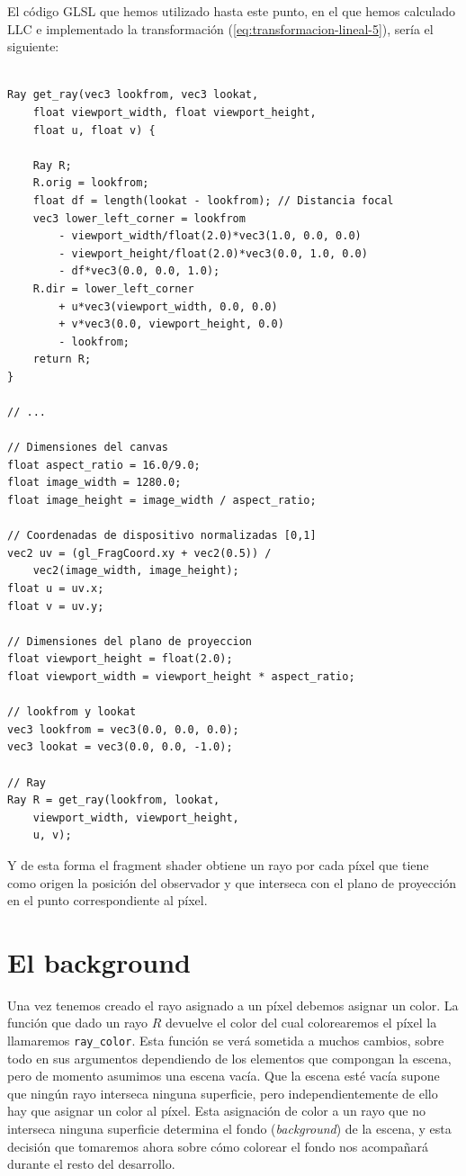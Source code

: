 El código GLSL que hemos utilizado hasta este punto, en el que hemos calculado $\mathrm{LLC}$ e implementado la transformación (\ref{eq:transformacion-lineal-5}), sería el siguiente:

\begin{lstlisting}

Ray get_ray(vec3 lookfrom, vec3 lookat, 
    float viewport_width, float viewport_height, 
    float u, float v) {
    
    Ray R;
    R.orig = lookfrom;
    float df = length(lookat - lookfrom); // Distancia focal
    vec3 lower_left_corner = lookfrom
        - viewport_width/float(2.0)*vec3(1.0, 0.0, 0.0)
        - viewport_height/float(2.0)*vec3(0.0, 1.0, 0.0) 
        - df*vec3(0.0, 0.0, 1.0);
    R.dir = lower_left_corner 
        + u*vec3(viewport_width, 0.0, 0.0)
        + v*vec3(0.0, viewport_height, 0.0) 
        - lookfrom;
    return R;
}

// ... 

// Dimensiones del canvas
float aspect_ratio = 16.0/9.0;
float image_width = 1280.0;
float image_height = image_width / aspect_ratio;

// Coordenadas de dispositivo normalizadas [0,1]
vec2 uv = (gl_FragCoord.xy + vec2(0.5)) / 
    vec2(image_width, image_height);
float u = uv.x;
float v = uv.y;

// Dimensiones del plano de proyeccion
float viewport_height = float(2.0);
float viewport_width = viewport_height * aspect_ratio;

// lookfrom y lookat
vec3 lookfrom = vec3(0.0, 0.0, 0.0);
vec3 lookat = vec3(0.0, 0.0, -1.0);

// Ray
Ray R = get_ray(lookfrom, lookat, 
    viewport_width, viewport_height, 
    u, v);
\end{lstlisting}

Y de esta forma el fragment shader obtiene un rayo por cada píxel que tiene como origen la posición del observador y que interseca con el plano de proyección en el punto correspondiente al píxel.

\section{El background}

Una vez tenemos creado el rayo asignado a un píxel debemos asignar un color. La función que dado un rayo $R$ devuelve el color del cual colorearemos el píxel la llamaremos \verb|ray_color|. Esta función se verá sometida a muchos cambios, sobre todo en sus argumentos dependiendo de los elementos que compongan la escena, pero de momento asumimos una escena vacía. Que la escena esté vacía supone que ningún rayo interseca ninguna superficie, pero independientemente de ello hay que asignar un color al píxel. Esta asignación de color a un rayo que no interseca ninguna superficie determina el fondo (\textit{background}) de la escena, y esta decisión que tomaremos ahora sobre cómo colorear el fondo nos acompañará durante el resto del desarrollo. 

